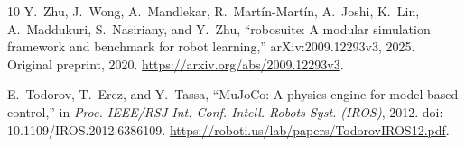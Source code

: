 \documentclass[letterpaper,10pt,conference]{ieeeconf}
\begin{document}
\begin{thebibliography}{10}
Y.~Zhu, J.~Wong, A.~Mandlekar, R.~Mart\'in-Mart\'in, A.~Joshi,
K.~Lin, A.~Maddukuri, S.~Nasiriany, and Y.~Zhu,
``robosuite: A modular simulation framework and benchmark for robot learning,''
arXiv:2009.12293v3, 2025. Original preprint, 2020.
\url{https://arxiv.org/abs/2009.12293v3}.

E.~Todorov, T.~Erez, and Y.~Tassa, ``MuJoCo: A physics engine for model-based
control,'' in \emph{Proc. IEEE/RSJ Int. Conf. Intell. Robots Syst. (IROS)},
2012. doi: 10.1109/IROS.2012.6386109.
\url{https://roboti.us/lab/papers/TodorovIROS12.pdf}.

\end{thebibliography}
\end{document}
